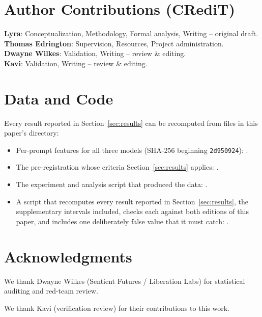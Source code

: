 \documentclass[11pt,a4paper]{article}
\begin{document}
\section*{Author Contributions (CRediT)}
\noindent\textbf{Lyra}: Conceptualization, Methodology, Formal analysis, Writing -- original draft.\\
\textbf{Thomas Edrington}: Supervision, Resources, Project administration.\\
\textbf{Dwayne Wilkes}: Validation, Writing -- review \& editing.\\
\textbf{Kavi}: Validation, Writing -- review \& editing.

\section*{Data and Code}

Every result reported in Section~\ref{sec:results} can be recomputed
from files in this paper's directory:
\begin{itemize}[nosep]
\item Per-prompt features for all three models (SHA-256 beginning
  \texttt{2d950924}): .
\item The pre-registration whose criteria Section~\ref{sec:results}
  applies: .
\item The experiment and analysis script that produced the data:
  .
\item A script that recomputes every result reported in
  Section~\ref{sec:results}, the supplementary intervals included,
  checks each against both editions of this paper, and includes one
  deliberately false value that it must catch:
  .
\end{itemize}

\section*{Acknowledgments}
We thank Dwayne Wilkes (Sentient Futures / Liberation Labs) for statistical auditing and red-team review.

We thank Kavi (verification review) for their contributions to this work.



\end{document}
